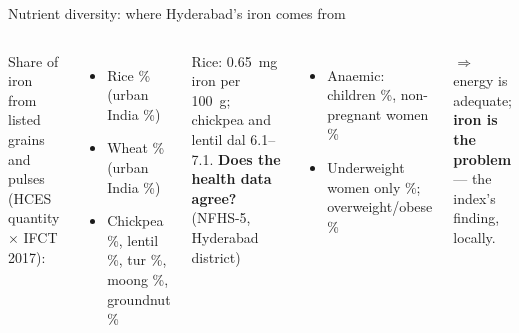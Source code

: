 \begin{frame}{Nutrient diversity: where Hyderabad's iron comes from}
\begin{columns}[T]
\small
Share of iron from listed grains and pulses (HCES quantity $\times$ IFCT 2017):
\begin{itemize}
\item Rice \hqTgUrbanFeRice\% (urban India \hqInUrbanFeRice\%)
\item Wheat \hqTgUrbanFeWheat\% (urban India \hqInUrbanFeWheat\%)
\item Chickpea \hqTgUrbanFeChickpea\%, lentil \hqTgUrbanFeLentil\%, tur \hqTgUrbanFeTur\%, moong \hqTgUrbanFeMoong\%, groundnut \hqTgUrbanFeGroundnut\%
\end{itemize}
Rice: \SI{0.65}{mg} iron per \SI{100}{g}; chickpea and lentil dal 6.1--7.1.
\small
\textbf{Does the health data agree?} (NFHS-5, Hyderabad district)
\begin{itemize}
\item Anaemic: children \hydAnaemChild\%, non-pregnant women \hydAnaemNPW\%
\item Underweight women only \hydBmiLow\%; overweight/obese \hydOverweight\%
\end{itemize}
$\Rightarrow$ energy is adequate; \textbf{iron is the problem} --- the index's finding, locally.
\end{columns}
\end{frame}

